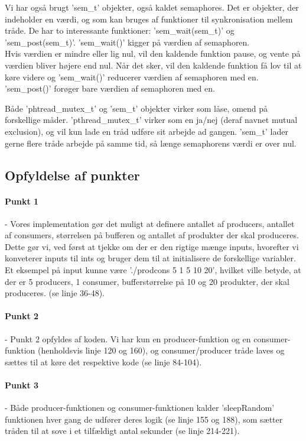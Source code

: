 Vi har også brugt 'sem\_t' objekter, også kaldet semaphores. Det er objekter, der indeholder en værdi, og som kan bruges af funktioner til synkronisation mellem tråde. De har to interessante funktioner: 'sem\_wait(sem\_t)' og 'sem\_post(sem\_t)'. 'sem\_wait()' kigger på værdien af semaphoren. 
\\Hvis værdien er mindre eller lig nul, vil den kaldende funktion pause, og vente på værdien bliver højere end nul. Når det sker, vil den kaldende funktion få lov til at køre videre og 'sem\_wait()' reducerer værdien af semaphoren med en. 'sem\_post()' forøger bare værdien af semaphoren med en.

Både 'phtread\_mutex\_t' og 'sem\_t' objekter virker som låse, omend på forskellige måder. 'pthread\_mutex\_t' virker som en ja/nej (deraf navnet mutual exclusion), og vil kun lade en tråd udføre sit arbejde ad gangen. 'sem\_t' lader gerne flere tråde arbejde på samme tid, så længe semaphorens værdi er over nul.

\subsection{Opfyldelse af punkter}
\label{O3_Punkter}
\paragraph{Punkt 1} - Vores implementation gør det muligt at definere antallet af producers, antallet af consumers, størrelsen på bufferen og antallet af produkter der skal produceres. Dette gør vi, ved først at tjekke om der er den rigtige mænge inputs, hvorefter vi konveterer inputs til ints og bruger dem til at initialisere de forskellige variabler. Et eksempel på input kunne være './prodcons 5 1 5 10 20', hvilket ville betyde, at der er 5 producers, 1 consumer, bufferstørrelse på 10 og 20 produkter, der skal produceres. (se linje 36-48).
\paragraph{Punkt 2} - Punkt 2 opfyldes af koden. Vi har kun en producer-funktion og en consumer-funktion (henholdsvis linje 120 og 160), og consumer/producer tråde laves og sættes til at køre det respektive kode (se linje 84-104).
\paragraph{Punkt 3} - Både producer-funktionen og consumer-funktionen kalder 'sleepRandom' funktionen hver gang de udfører deres logik (se linje 155 og 188), som sætter tråden til at sove i et tilfældigt antal sekunder (se linje 214-221).
